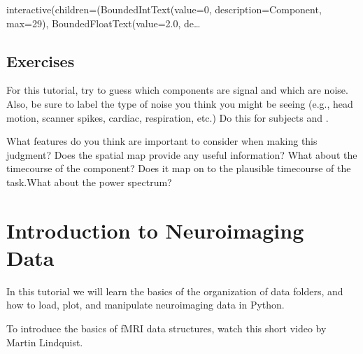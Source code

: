 \documentclass[letterpaper,10pt,english]{sphinxmanual}
\begin{document}
\begin{sphinxVerbatim}[commandchars=\\\{\}]
 
\end{sphinxVerbatim}

\begin{sphinxVerbatim}[commandchars=\\\{\}]
interactive(children=(BoundedIntText(value=0, description=\PYGZsq{}Component\PYGZsq{}, max=29), BoundedFloatText(value=2.0, de…
\end{sphinxVerbatim}



\subsection{Exercises}
\label{\detokenize{content/ICA:exercises}}
For this tutorial, try to guess which components are signal and which are noise. Also, be sure to label the type of noise you think you might be seeing (e.g., head motion, scanner spikes, cardiac, respiration, etc.) Do this for subjects  and .

What features do you think are important to consider when making this judgment?  Does the spatial map provide any useful information? What about the timecourse of the component? Does it map on to the plausible timecourse of the task.What about the power spectrum?


\section{Introduction to Neuroimaging Data}
\label{\detokenize{content/Introduction_to_Neuroimaging_Data:introduction-to-neuroimaging-data}}\label{\detokenize{content/Introduction_to_Neuroimaging_Data::doc}}
In this tutorial we will learn the basics of the organization of data folders, and how to load, plot, and manipulate neuroimaging data in Python.

To introduce the basics of fMRI data structures, watch this short video by Martin Lindquist.

\begin{sphinxVerbatim}[commandchars=\\\{\}]
   

\end{sphinxVerbatim}
\end{document}
